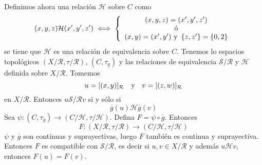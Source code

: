 \documentclass[12pt]{report}
\theoremstyle{largebreak}
\newcommand\cf[3]{\ensuremath{#1:#2\rightarrow#3}}
\begin{document}
\begin{exa}
        Definimos ahora una relación $\mathcal{H}$ sobre $C$ como
        \begin{equation*}
            (x,y,z)\mathcal{H}(x',y',z')\iff \left\{
                \begin{array}{c}
                    (x,y,z)=(x',y',z')\\
                    \textup{ó}\\
                    (x,y)=(x',y')\textup{ y }\left\{z,z'\right\}=\left\{0,2 \right\}\\
                \end{array}
            \right.
        \end{equation*}
        se tiene que $\mathcal{H}$ es una relación de equivalencia sobre $C$. Tenemos lo espacios topológicos $(X/\mathcal{R},\tau/\mathcal{R})$, $(C,\tau_g)$ y las relaciones de equivalencia $\mathcal{S}/\mathcal{R}$ y $\mathcal{H}$ definida sobre $X/\mathcal{R}$. Tomemos
        \begin{equation*}
            u=[(x,y)]_{\mathcal{R}}\quad\textup{y}\quad v=[(z,w)]_{\mathcal{R}}
        \end{equation*}
        en $X/\mathcal{R}$. Entonces $u\mathcal{S}/\mathcal{R}v$ si y sólo si
        \begin{equation*}
            \overline{g}(u)\mathcal{H}\overline{g}(v)
        \end{equation*}
        Sea $\cf{\psi}{(C,\tau_g)}{(C/\mathcal{H},\tau/\mathcal{H})}$. Defina $F=\psi\circ\overline{g}$. Entonces
        \begin{equation*}
            \cf{F}{(X/\mathcal{R},\tau/\mathcal{R})}{(C/\mathcal{H},\tau/\mathcal{H})}
        \end{equation*}
        $\psi$ y $\overline{g}$ son continuas y suprayectivas, luego $F$ también es continua y suprayectiva. Entonces $F$ es compatible con $\mathcal{S}/\mathcal{R}$, es decir si $u,v\in X/\mathcal{R}$ y además $u\mathcal{H}v$, entonces $F(u)=F(v)$.


\end{exa}
\end{document}
